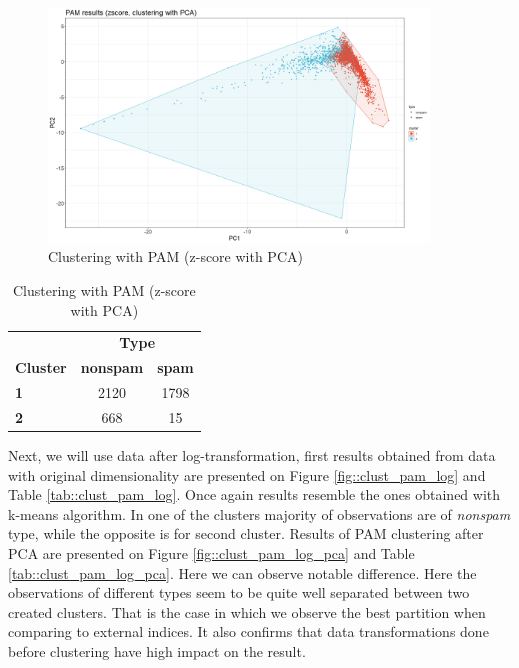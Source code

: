 \documentclass{article}
\begin{document}
	\begin{figure}[h]
		\centering
		\includegraphics[width=0.9\textwidth]{proj2_plots/pam_res_scaled_pca.png}
		\caption{Clustering with PAM (z-score with PCA)}
		\label{fig::clust_pam_scaled_pca}
	\end{figure}
	
	\begin{table}[h]
		\centering
		\begin{tabular}{lcc}
			& \multicolumn{2}{c}{\textbf{Type}} \\
			\textbf{Cluster} & \textbf{nonspam} & \textbf{spam} \\
			\textbf{1} & 2120 & 1798 \\
			\textbf{2} & 668 & 15 \\
		\end{tabular}
		\caption{Clustering with PAM (z-score with PCA)}
		\label{tab::clust_pam_scaled_pca}
	\end{table}
	
	Next, we will use data after log-transformation, first results obtained from data with original dimensionality are presented on Figure \ref{fig::clust_pam_log} and Table \ref{tab::clust_pam_log}. Once again results resemble the ones obtained with k-means algorithm. In one of the clusters majority of observations are of \textit{nonspam} type, while the opposite is for second cluster. Results of PAM clustering after PCA are presented on Figure \ref{fig::clust_pam_log_pca} and Table \ref{tab::clust_pam_log_pca}. Here we can observe notable difference. Here the observations of different types seem to be quite well separated between two created clusters. That is the case in which we observe the best partition when comparing to external indices. It also confirms that data transformations done before clustering have high impact on the result.
	
\end{document}
